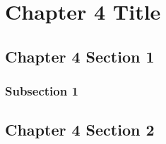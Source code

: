 \chapter{Chapter 4 Title}
\section{Chapter 4 Section 1}
\subsection{Subsection 1}
\section{Chapter 4 Section 2}
